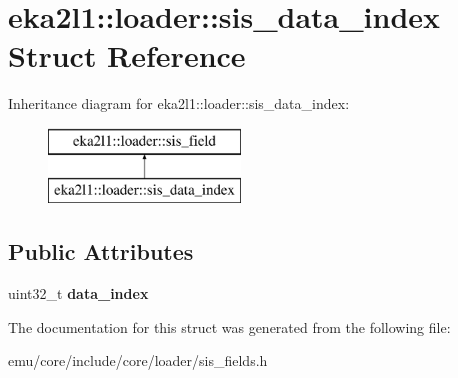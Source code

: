 \hypertarget{structeka2l1_1_1loader_1_1sis__data__index}{}\section{eka2l1\+:\+:loader\+:\+:sis\+\_\+data\+\_\+index Struct Reference}
\label{structeka2l1_1_1loader_1_1sis__data__index}
Inheritance diagram for eka2l1\+:\+:loader\+:\+:sis\+\_\+data\+\_\+index\+:\begin{figure}[H]
\begin{center}
\leavevmode
\includegraphics[height=2.000000cm]{structeka2l1_1_1loader_1_1sis__data__index}
\end{center}
\end{figure}
\subsection*{Public Attributes}
\begin{DoxyCompactItemize}
\item 
\mbox{\label{structeka2l1_1_1loader_1_1sis__data__index_a34cde804dba6e859529e299cb31f9a92}} 
uint32\+\_\+t {\bfseries data\+\_\+index}
\end{DoxyCompactItemize}


The documentation for this struct was generated from the following file\+:\begin{DoxyCompactItemize}
\item 
emu/core/include/core/loader/sis\+\_\+fields.\+h\end{DoxyCompactItemize}
